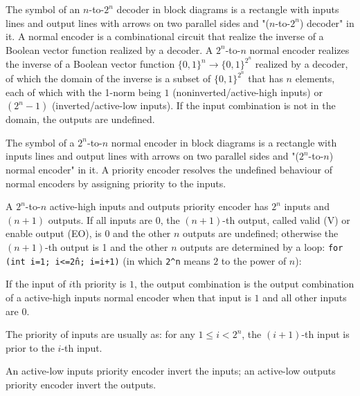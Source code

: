 \documentclass[a4paper,12pt]{report}
\begin{document}
The symbol of an $n$-to-$2^n$ decoder in block diagrams is a rectangle with inputs lines and output lines with arrows on two parallel sides and "($n$-to-$2^n$) decoder" in it.
A normal encoder is a combinational circuit that realize the inverse of a Boolean vector function realized by a decoder. A $2^n$-to-$n$ normal encoder realizes the inverse of a Boolean vector function $\{0,1\}^n\to\{0,1\}^{2^n}$ realized by a decoder, of which the domain of the inverse is a subset of $\{0,1\}^{2^n}$ that has $n$ elements, each of which with the 1-norm being $1$ (noninverted/active-high inputs) or $(2^n-1)$ (inverted/active-low inputs). If the input combination is not in the domain, the outputs are undefined.

The symbol of a $2^n$-to-$n$ normal encoder in block diagrams is a rectangle with inputs lines and output lines with arrows on two parallel sides and "($2^n$-to-$n$) normal encoder" in it.
A priority encoder resolves the undefined behaviour of normal encoders by assigning priority to the inputs.

A $2^n$-to-$n$ active-high inputs and outputs priority encoder has $2^n$ inputs and $(n+1)$ outputs. If all inputs are 0, the $(n+1)$-th output, called valid (V) or enable output (EO), is 0 and the other $n$ outputs are undefined; otherwise the $(n+1)$-th output is 1 and the other $n$ outputs are determined by a loop: \texttt{for (int i=1; i<=2\^n; i=i+1)} (in which \verb|2^n| means $2$ to the power of $n$):
\bit
\item If the input of $i$th priority is $1$, the output combination is the output combination of a active-high inputs normal encoder when that input is $1$ and all other inputs are $0$.
\eit

The priority of inputs are usually as: for any $1\leq i<2^n$, the $(i+1)$-th input is prior to the $i$-th input.

An active-low inputs priority encoder invert the inputs; an active-low outputs priority encoder invert the outputs.
\end{document}
